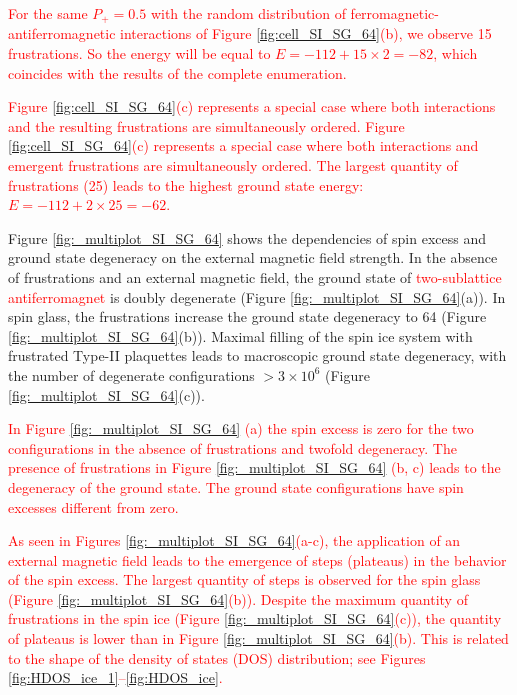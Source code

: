 \documentclass[preprint,12pt]{elsarticle}
\begin{document}
	\textcolor{red}{For the same $P_+ = 0.5$ with the random distribution of ferromagnetic-antiferromagnetic interactions of Figure \ref{fig:cell_SI_SG_64}(b), we observe 15 frustrations. So the energy will be equal to $E = -112 + 15\times2 = -82$, which coincides with the results of the complete enumeration.}
	
	\textcolor{red}{Figure \ref{fig:cell_SI_SG_64}(c) represents a special case where both interactions and the resulting frustrations are simultaneously ordered. Figure \ref{fig:cell_SI_SG_64}(c) represents a special case where both interactions and emergent frustrations are simultaneously ordered. The largest quantity of frustrations (25) leads to the highest ground state energy: $E = -112 + 2\times25 = -62$.}
	
	Figure \ref{fig:_multiplot_SI_SG_64} shows the dependencies of spin excess and ground state degeneracy on the external magnetic field strength.
	In the absence of frustrations and an external magnetic field, the ground state of \textcolor{red}{two-sublattice antiferromagnet} is doubly degenerate (Figure \ref{fig:_multiplot_SI_SG_64}(a)).
	In spin glass, the frustrations increase the ground state degeneracy to 64 (Figure \ref{fig:_multiplot_SI_SG_64}(b)).
	Maximal filling of the spin ice system with frustrated Type-II plaquettes leads to macroscopic ground state degeneracy, with the number of degenerate configurations $> 3\times10^{6}$ (Figure \ref{fig:_multiplot_SI_SG_64}(c)).
	
	\textcolor{red}{In Figure \ref{fig:_multiplot_SI_SG_64} (a) the spin excess is zero for the two configurations in the absence of frustrations and twofold degeneracy. The presence of frustrations in Figure \ref{fig:_multiplot_SI_SG_64} (b, c) leads to the degeneracy of the ground state. The ground state configurations have spin excesses different from zero.}
	
	
	\textcolor{red}{As seen in Figures \ref{fig:_multiplot_SI_SG_64}(a-c), the application of an external magnetic field leads to the emergence of steps (plateaus) in the behavior of the spin excess. The largest quantity of steps is observed for the spin glass (Figure \ref{fig:_multiplot_SI_SG_64}(b)). Despite the maximum quantity of frustrations in the spin ice (Figure \ref{fig:_multiplot_SI_SG_64}(c)), the quantity of plateaus is lower than in Figure \ref{fig:_multiplot_SI_SG_64}(b). This is related to the shape of the density of states (DOS) distribution; see Figures \ref{fig:HDOS_ice_1}–\ref{fig:HDOS_ice}.}
	
\end{document}
